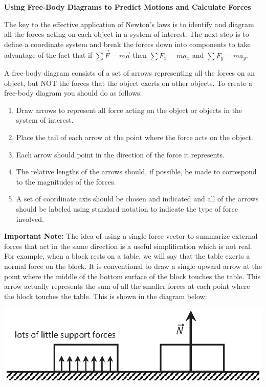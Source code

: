 \textbf{Using Free-Body Diagrams to Predict Motions and Calculate Forces }

The key to the effective application of Newton's laws is to identify and diagram
all the forces acting on each object in a system of interest. The next step
is to define a coordinate system and break the forces down into components to
take advantage of the fact that if \( \sum{\vec F}  = m{\vec a}\) then
\( \sum F_{x} = ma_{x} \) and \( \sum F_{y} =
ma_{y} \).

A free-body diagram consists of a set of arrows representing all the forces
on an object, but NOT the forces that the object exerts on other objects. To
create a free-body diagram you should do as follows: 

\begin{enumerate}
\item Draw arrows to represent all force acting on the object or objects in the system
of interest. 
\item Place the tail of each arrow at the point where the force acts on the object. 
\item Each arrow should point in the direction of the force it represents. 
\item The relative lengths of the arrows should, if possible, be made to correspond
to the magnitudes of the forces. 
\item A set of coordinate axis should be chosen and indicated and all of the arrows
should be labeled using standard notation to indicate the type of force involved.
\end{enumerate}
\textbf{Important Note:} The idea of using a single force vector to summarize
external forces that act in the same direction is a useful simplification which
is not real. For example, when a block rests on a table, we will say that the
table exerts a normal force on the block. It is conventional to draw a single
upward arrow at the point where the middle of the bottom surface of the block
touches the table. This arrow actually represents the sum of all the smaller
forces at each point where the block touches the table. This is shown in the
diagram below:

{\par\centering \includegraphics{friction/normal_forces.eps} \par}
\vspace{0.3cm}

